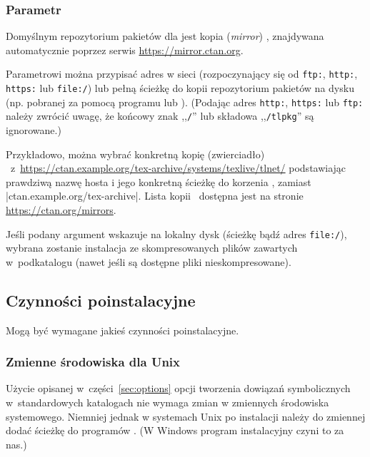 \documentclass{article}
\begin{document}
\subsubsection{Parametr }
\label{sec:location}

Domyślnym repozytorium pakietów dla \TL{} jest kopia (\textit{mirror}) \CTAN,
znajdywana automatycznie poprzez serwis \url{https://mirror.ctan.org}.

Parametrowi  można przypisać adres w sieci
(rozpoczynający się  od \texttt{ftp:}, \texttt{http:}, \texttt{https:} lub \texttt{file:/})
lub pełną ścieżkę do kopii repozytorium pakietów na dysku (np. pobranej za pomocą
programu  lub ). (Podając adres \texttt{http:}, \texttt{https:}
lub \texttt{ftp:} należy zwrócić uwagę, że końcowy znak ,,\texttt{/}'' lub składowa
,,\texttt{/tlpkg}'' są ignorowane.)

Przykładowo, można wybrać konkretną kopię (zwierciadło) \CTAN\
z~\url{https://ctan.example.org/tex-archive/systems/texlive/tlnet/} podstawiając
prawdziwą nazwę hosta i jego konkretną ścieżkę do korzenia \CTAN, zamiast
|ctan.example.org/tex-archive|. Lista kopii \CTAN\ dostępna jest na
stronie \url{https://ctan.org/mirrors}.

Jeśli podany argument wskazuje na lokalny dysk (ścieżkę bądź adres \texttt{file:/}), wybrana
zostanie instalacja ze skompresowanych plików  zawartych 
w~podkatalogu  (nawet jeśli są dostępne pliki nieskompresowane).

\subsection{Czynności poinstalacyjne}
\label{sec:postinstall}

Mogą być wymagane jakieś czynności poinstalacyjne.

\subsubsection{Zmienne środowiska dla Unix}
\label{sec:env}

Użycie opisanej w~części~\ref{sec:options} opcji tworzenia dowiązań
symbolicznych w~standardowych katalogach nie wymaga zmian w zmiennych
środowiska systemowego. Niemniej jednak w systemach Unix
po instalacji należy do zmiennej  dodać ścieżkę do
programów \TL. (W Windows program instalacyjny czyni to za nas.)
\end{document}
